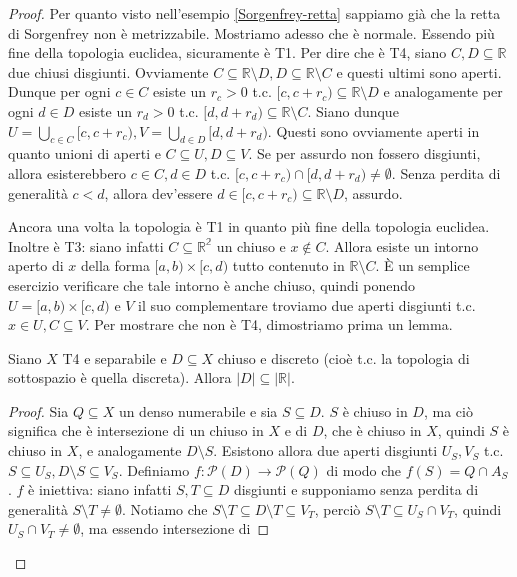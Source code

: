\begin{proof}
  Per quanto visto nell'esempio \ref{Sorgenfrey-retta} sappiamo già che la retta di Sorgenfrey non è metrizzabile. Mostriamo adesso che è normale. Essendo più fine della topologia euclidea, sicuramente è T1. Per dire che è T4, siano $C, D \subseteq \mathbb{R}$ due chiusi disgiunti. Ovviamente $C \subseteq \mathbb{R} \setminus D, D \subseteq \mathbb{R} \setminus C$ e questi ultimi sono aperti. Dunque per ogni $c \in C$ esiste un  $r_c>0$ t.c. $[c, c+r_c) \subseteq \mathbb{R} \setminus D$ e analogamente per ogni
  $d \in D$ esiste un $r_d>0$ t.c. $[d, d+r_d) \subseteq \mathbb{R} \setminus C$. Siano dunque $\displaystyle U =\bigcup_{c \in C} [c, c+r_c), V=\bigcup_{d \in D} [d, d+r_d)$. Questi sono ovviamente aperti in quanto unioni di aperti e $C \subseteq U, D \subseteq V$. Se per assurdo non fossero disgiunti, allora esisterebbero $c \in C, d \in D$ t.c. $[c, c+r_c) \cap [d, d+r_d) \not= \emptyset$. Senza perdita di generalità $c<d$, allora dev'essere
  $d \in [c, c+r_c) \subseteq \mathbb{R} \setminus D$, assurdo.
  \item Ancora una volta la topologia è T1 in quanto più fine della topologia euclidea. Inoltre è T3: siano infatti $C \subseteq \mathbb{R^2}$ un chiuso e $x \not \in C$. Allora esiste un intorno aperto di $x$ della forma $[a, b) \times [c, d)$ tutto contenuto in $\mathbb{R} \setminus C$. È un semplice esercizio verificare che tale intorno è anche chiuso, quindi ponendo $U=[a, b) \times [c, d)$ e $V$ il suo complementare troviamo due aperti disgiunti t.c. $x \in U, C \subseteq V$.
  Per mostrare che non è T4, dimostriamo prima un lemma.
  \begin{lm}
    Siano $X$ T4 e separabile e $D \subseteq X$ chiuso e discreto (cioè t.c. la topologia di sottospazio è quella discreta). Allora $|D| \subseteq |\mathbb{R}|$.
  \end{lm}
  \begin{proof}
    Sia $Q \subseteq X$ un denso numerabile e sia $S \subseteq D$. $S$ è chiuso in $D$, ma ciò significa che è intersezione di un chiuso in $X$ e di $D$, che è chiuso in $X$, quindi $S$ è chiuso in $X$, e analogamente $D \setminus S$. Esistono allora due aperti disgiunti $U_S, V_S$ t.c. $S \subseteq U_S, D \setminus S \subseteq V_S$. Definiamo $f: \mathcal{P}(D) \rightarrow \mathcal{P}(Q)$ di modo che $f(S)=Q \cap A_S$. $f$ è iniettiva:
    siano infatti $S, T \subseteq D$ disgiunti e supponiamo senza perdita di generalità $S \setminus T \not= \emptyset$. Notiamo che $S \setminus T \subseteq D \setminus T \subseteq V_T$, perciò $S \setminus T \subseteq U_S \cap V_T$, quindi $U_S \cap V_T \not= \emptyset$, ma essendo intersezione di

\end{proof}
\end{proof}
